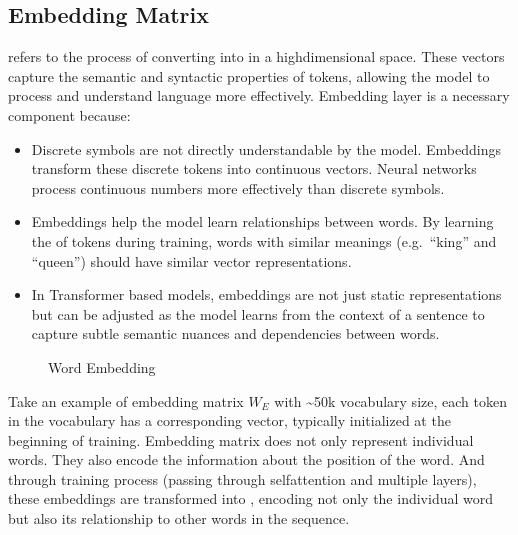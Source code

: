 \documentclass[letterpaper,11pt,english]{sphinxmanual}
\begin{document}
\subsection{Embedding Matrix}
\label{\detokenize{pretraining:embedding-matrix}}
\sphinxAtStartPar
{} refers to the process of converting  into  in a high\sphinxhyphen{}dimensional space. These vectors capture the
semantic and syntactic properties of tokens, allowing the model to
process and understand language more effectively. Embedding layer is a
necessary component because:
\begin{itemize}
\item {} 
\sphinxAtStartPar
Discrete symbols are not directly understandable by the model.
Embeddings transform these discrete tokens into continuous vectors.
Neural networks process continuous numbers more effectively than
discrete symbols.

\item {} 
\sphinxAtStartPar
Embeddings help the model learn relationships between words. By
learning the  of tokens during training, words
with similar meanings (e.g. “king” and “queen”) should have similar
vector representations.

\item {} 
\sphinxAtStartPar
In Transformer based models, embeddings are not just static
representations but can be adjusted as the model learns from the
context of a sentence to capture subtle semantic nuances and
dependencies between words.

\end{itemize}

\begin{figure}[htbp]
\centering
\capstart

\noindent{}
\caption{Word Embedding}\label{\detokenize{pretraining:id12}}\end{figure}

\sphinxAtStartPar
Take an example of embedding matrix \(W_E\) with \textasciitilde{}50k vocabulary
size, each token in the vocabulary has a corresponding vector, typically
initialized  at the beginning of training. Embedding matrix
does not only represent individual words. They also encode the
information about the position of the word. And through training process
(passing through self\sphinxhyphen{}attention and multiple layers), these embeddings
are transformed into , encoding not only the
individual word but also its relationship to other words in the
sequence.
\end{document}
